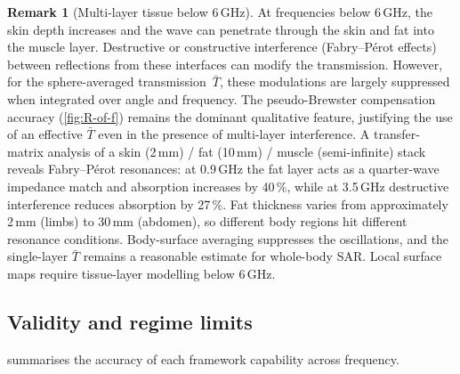 \documentclass[11pt,a4paper]{article}
\theoremstyle{definition}      %
\newtheorem{remark}[remark]{Remark}
\newcommand{\Tbar}{\bar{T}}
\begin{document}
\begin{remark}[Multi-layer tissue below 6\,GHz]
At frequencies below 6\,GHz, the skin depth increases and the wave
can penetrate through the skin and fat into the muscle layer.
Destructive or constructive interference (Fabry--P\'erot effects)
between reflections from these interfaces can modify the transmission.
However, for the sphere-averaged transmission~$\Tbar$, these
modulations are largely suppressed when integrated over angle and
frequency.  The pseudo-Brewster compensation accuracy (\cref{fig:R-of-f})
remains the dominant qualitative feature, justifying the use of an
effective $\Tbar$ even in the presence of multi-layer interference.
A transfer-matrix analysis of a skin (2\,mm) / fat (10\,mm) / muscle (semi-infinite)
stack reveals Fabry--P\'erot resonances: at 0.9\,GHz the fat layer
acts as a quarter-wave impedance match and absorption increases by
40\,\%, while at 3.5\,GHz destructive interference reduces
absorption by 27\,\%.  Fat thickness varies from approximately 2\,mm
(limbs) to 30\,mm (abdomen), so different body regions hit different
resonance conditions.  Body-surface averaging suppresses the
oscillations, and the single-layer $\Tbar$ remains a reasonable
estimate for whole-body SAR.  Local surface maps require
tissue-layer modelling below 6\,GHz.
\end{remark}

\subsection{Validity and regime limits}\label{sec:traffic-light}

 summarises the accuracy of each framework
capability across frequency.
\end{document}
